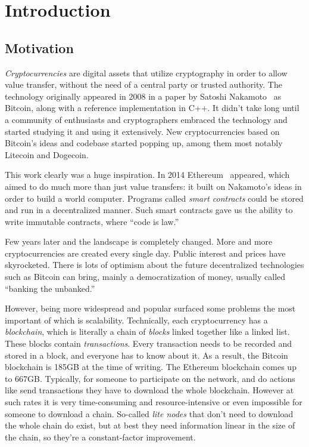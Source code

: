 \chapter{Introduction}

\section{Motivation}
\emph{Cryptocurrencies} are digital assets that utilize cryptography in order to allow value transfer, without the need of a central party or trusted authority. The technology originally appeared in 2008 in a paper by Satoshi Nakamoto~\cite{bitcoin} as Bitcoin, along with a reference implementation in C++. It didn't take long until a community of enthusiasts and cryptographers embraced the technology and started studying it and using it extensively. New cryptocurrencies based on Bitcoin's ideas and codebase started popping up, among them most notably Litecoin and Dogecoin.

This work clearly was a huge inspiration. In 2014 Ethereum~\cite{ethereum} appeared, which aimed to do much more than just value transfers: it built on Nakamoto's ideas in order to build a world computer. Programs called \emph{smart contracts} could be stored and run in a decentralized manner. Such smart contracts gave us the ability to write immutable contracts, where ``code is law.''

Few years later and the landscape is completely changed. More and more cryptocurrencies are created every single day. Public interest and prices have skyrocketed. There is lots of optimism about the future decentralized technologies such as Bitcoin can bring, mainly a democratization of money, usually called ``banking the unbanked.''

However, being more widespread and popular surfaced some problems the most important of which is scalability. Technically, each cryptocurrency has a \emph{blockchain}, which is literally a chain of \emph{blocks} linked together like a linked list. These blocks contain \emph{transactions}. Every transaction needs to be recorded and stored in a block, and everyone has to know about it. As a result, the Bitcoin blockchain is 185GB at the time of writing. The Ethereum blockchain comes up to 667GB. Typically, for someone to participate on the network, and do actions like send transactions they have to download the whole blockchain. However at such rates it is very time-consuming and resource-intensive or even impossible for someone to download a chain. So-called \emph{lite nodes} that don't need to download the whole chain do exist, but at best they need information linear in the size of the chain, so they're a constant-factor improvement.


